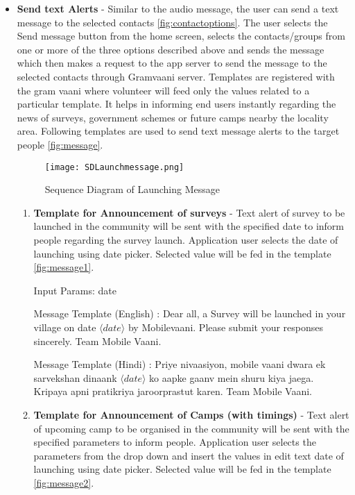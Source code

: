 \begin{itemize}
\item\textbf {Send text Alerts} - Similar to the audio message, the user can
send a text message to the selected contacts \ref{fig:contactoptions}. The user selects the Send
message button from the home screen, selects the contacts/groups from
one or more of the three options described above and sends the message
which then makes a request to the app server to send the message to
the selected contacts through Gramvaani server. Templates are registered with the gram vaani where volunteer will feed only the values related to a particular template. It helps in informing end users instantly regarding the news of surveys, government schemes or future camps nearby the locality area. Following templates are used to send text message alerts to the target people \ref{fig:message}.

\begin{figure}[H]
    \centering
	\texttt{[image: SDLaunchmessage.png]}
    \caption{ Sequence Diagram of Launching Message}
    \label{fig:Sequence Diagram of Launching Message}
\end{figure}

\begin{enumerate}
\item \textbf {Template for Announcement of surveys} - Text alert of survey to be launched in the community will be sent with the specified date to inform people regarding the survey launch. Application user selects the date of launching using date picker. Selected value will be fed in the template \ref{fig:message1}.

Input Params: date 

Message Template (English) : Dear all, a Survey ​will be launched in your village on date $\langle date \rangle$  by Mobilevaani. Please submit your responses sincerely. ​Team Mobile Vaani.
 
Message Template (Hindi) : Priye nivaasiyon​, mobile vaani dwara ​ek sarvekshan dinaank $\langle date\rangle$  ko ​aapke​ gaanv mein shuru kiya jaega. Kripaya apni pratikriya ​jaroor​  prastut karen. Team Mobile Vaani.

\item \textbf {Template for Announcement of Camps (with timings)} - Text alert of upcoming camp to be organised in the community will be sent with the specified parameters to inform people. Application user selects the parameters from the drop down and insert the values in edit text date of launching using date picker. Selected value will be fed in the template \ref{fig:message2}.


\end{enumerate}
\end{itemize}
